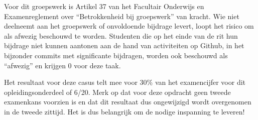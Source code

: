 \documentclass[fleqn,10pt]{voorstel}
\begin{document}
Voor dit groepswerk is Artikel 37 van het Facultair Onderwijs en Examenreglement over ``Betrokkenheid bij groepswerk'' van kracht. Wie niet deelneemt aan het groepswerk of onvoldoende bijdrage levert, loopt het risico om als afwezig beschouwd te worden. Studenten die op het einde van de rit hun bijdrage niet kunnen aantonen aan de hand van activiteiten op Github, in het bijzonder commits met significante bijdragen, worden ook beschouwd als ``afwezig'' en krijgen 0 voor deze taak.

Het resultaat voor deze casus telt mee voor 30\% van het examencijfer voor dit opleidingsonderdeel of 6/20. Merk op dat voor deze opdracht geen tweede examenkans voorzien is en dat dit resultaat dus ongewijzigd wordt overgenomen in de tweede zittijd. Het is dus belangrijk om de nodige inspanning te leveren!


\printbibliography[heading=bibintoc]
\end{document}
